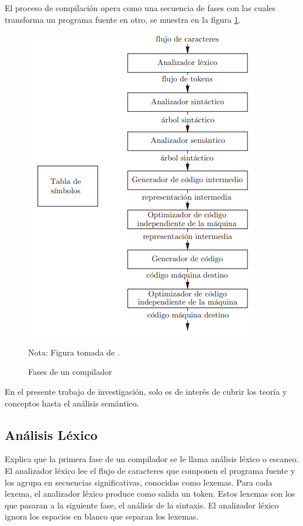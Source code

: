 El proceso de compilación opera como una secuencia de fases con las cuales transforma un programa fuente en otro, se muestra en la figura \ref{fasesCompilador1}.
\begin{figure}[h!]
\centering
\includegraphics[scale=1]{imagenes/fasesCompilador1}
\caption{Fases de un compilador}
Nota: Figura tomada de \cite{aho2008compiladores}.
\label{fasesCompilador1}
\end{figure}

En el presente trabajo de investigación, solo es de interés de cubrir los teoría y conceptos hasta el análisis semántico.

\subsection{Análisis Léxico}
\cite{aho2008compiladores} Explica que la primera fase de un compilador se le llama análisis léxico o escaneo. El analizador léxico lee el flujo de caracteres que componen el programa fuente y los agrupa en secuencias significativas, conocidas como lexemas. Para cada lexema, el analizador léxico produce como salida un token. Estos lexemas son los que pasaran a la siguiente fase, el análisis de la sintaxis. El analizador léxico ignora los espacios en blanco que separan los lexemas.\\

